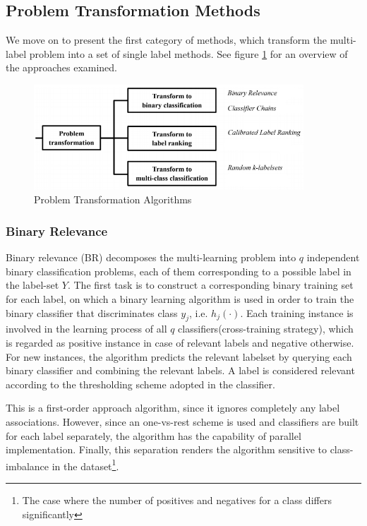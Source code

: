 \documentclass[12pt]{report}
\begin{document}
	\subsection*{Problem Transformation Methods}
  We move on to present the first category of methods, which transform the
  multi-label problem into a set of single label methods. See figure \ref{figure:ptm} for an overview of the approaches examined.

	\begin{figure}[H]
		\centering
		\includegraphics[width=0.9\textwidth]{pt.png}
		\caption{Problem Transformation Algorithms}
		\centering
    \label{figure:ptm}
	\end{figure}

	\subsubsection*{Binary Relevance}
	Binary relevance (BR) decomposes the multi-learning problem into $q$
  independent binary classification problems, each of them corresponding to a
  possible label in the label-set $Y$. The first task is to construct a
  corresponding binary training set for each label, on which a binary learning
  algorithm is used in order to train the binary classifier that discriminates
  class $y_j$, i.e. $h_j(\cdot)$. Each training instance is involved in the
  learning process of all $q$ classifiers(cross-training strategy), which is
  regarded as positive instance in case of relevant labels and negative
  otherwise. For new instances, the algorithm predicts the relevant labelset by
  querying each binary classifier and combining the relevant labels. A label is
  considered relevant according to the thresholding scheme adopted in the classifier.
	
	This is a first-order approach algorithm, since it ignores completely any
  label associations. However, since an one-vs-rest scheme is used and
  classifiers are built for each label separately, the algorithm has the
  capability of parallel implementation. Finally, this separation renders the
  algorithm sensitive to class-imbalance in the dataset\footnote{The case where
    the number of positives and negatives for a class differs significantly}.
	
\end{document}
